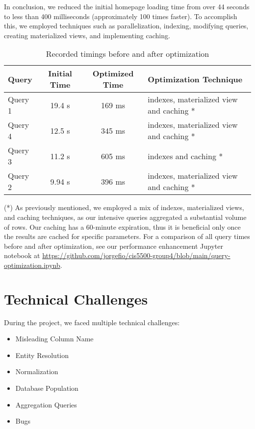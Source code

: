\documentclass[12pt]{article}
\begin{document}
In conclusion, we reduced the initial homepage loading time from over 44 seconds to less than 400 milliseconds (approximately 100 times faster). To accomplish this, we employed techniques such as parallelization, indexing, modifying queries, creating materialized views, and implementing caching.

\begin{table}[htbp]
  \centering
  \begin{tabular}{|l|c|c|l|}
    \hline
    Query & Initial Time & Optimized Time & Optimization Technique \\
    \hline
    Query 1 & 19.4 s & 169 ms & indexes, materialized view and caching * \\
    Query 4 & 12.5 s & 345 ms & indexes, materialized view and caching * \\
    Query 3 & 11.2 s & 605 ms & indexes and caching *  \\
    Query 2 & 9.94 s & 396 ms & indexes, materialized view and caching * \\
    \hline
  \end{tabular}
  \caption{Recorded timings before and after optimization}
  \label{tab:scores}
\end{table}
(*) As previously mentioned, we employed a mix of indexes, materialized views, and caching techniques, as our intensive queries aggregated a substantial volume of rows. Our caching has a 60-minute expiration, thus it is beneficial only once the results are cached for specific parameters. For a comparison of all query times before and after optimization, see our performance enhancement Jupyter notebook at \url{https://github.com/jorgefio/cis5500-group4/blob/main/query-optimization.ipynb}. 

\section{Technical Challenges}

During the project, we faced multiple technical challenges:
\begin{itemize}
  \item Misleading Column Name
  \item Entity Resolution
  \item Normalization
  \item Database Population
  \item Aggregation Queries
  \item Bugs
\end{itemize}
\end{document}
